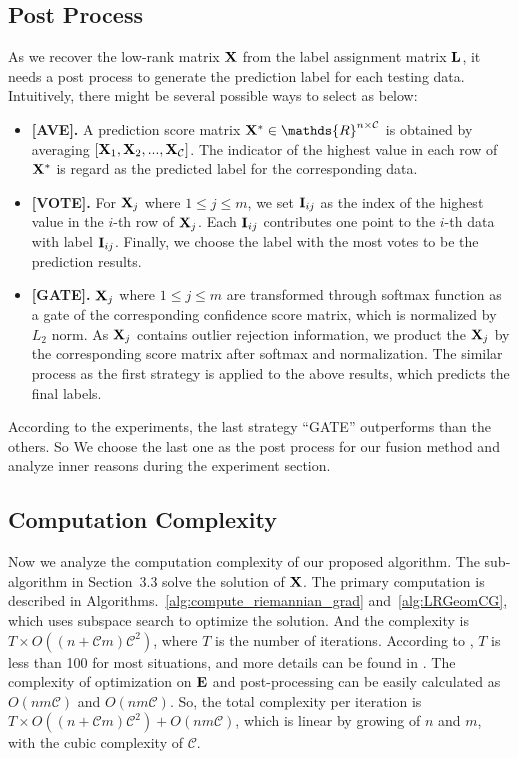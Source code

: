\documentclass[10pt,twocolumn,letterpaper]{article}
\def\bI{{\bf I}}
\def\bE{{\bf E}}
\def\calC{{\mathcal{C}}}
\def\bL{{\bf L}}
\def\dsR{\mathds{R}}
\def\bX{{\bf X}}
\def\bI{{\bf I}}
\def\bX{{\bf X}}
\begin{document}
\subsection{Post Process}
As we recover the low-rank matrix $\bX$ from the label assignment matrix $\bL$,
it needs a post process to generate the prediction label for each testing data.
Intuitively, there might be several possible ways to select as below:
\begin{itemize}
  \item \textbf{[AVE].} A prediction score matrix $\bX^{*} \in \dsR^{n \times {\calC}}$ is obtained by averaging $[ \bX_1, \bX_2, ..., \bX_{\calC}]$.
    The indicator of the highest value in each row of $\bX^{*}$ is regard as the predicted label for the corresponding data.
  \item \textbf{[VOTE].} For $\bX_j$ where $1 \leq j \leq m$, we set $\bI_{ij}$ as the index of the highest value in the $i$-th row of $\bX_j$.
      Each $\bI_{ij}$ contributes one point to the $i$-th data with label $\bI_{ij}$.
      Finally, we choose the label with the most votes to be the prediction results.
  \item \textbf{[GATE].} $\bX_j$ where $1 \leq j \leq m$ are transformed through softmax function as a gate of the corresponding confidence score matrix, which is normalized by $L_2$ norm.
      As $\bX_j$ contains outlier rejection information, we product the $\bX_j$ by the corresponding score matrix after softmax and normalization.
      The similar process as the first strategy is applied to the above results, which predicts the final labels.
\end{itemize}
According to the experiments, the last strategy ``GATE'' outperforms than the others.
So We choose the last one as the post process for our fusion method and analyze inner reasons during the experiment section.

\subsection{Computation Complexity}

Now we analyze the computation complexity of our proposed algorithm.
The sub-algorithm in Section~3.3 solve the solution of $\bX$.
The primary computation is described in Algorithms.~\ref{alg:compute_riemannian_grad} and~\ref{alg:LRGeomCG},
which uses subspace search to optimize the solution.
And the complexity is $T \times O((n+{\calC}m){\calC}^2)$, where $T$ is the number of iterations.
According to \cite{vandereycken2013lowrank}, $T$ is less than 100 for most situations,
and more details can be found in \cite{vandereycken2013lowrank}.
The complexity of optimization on $\bE$ and post-processing can be easily calculated as $O(nm{\calC})$ and $O(nm{\calC})$.
So, the total complexity per iteration is $T \times O((n+{\calC}m){\calC}^2) + O(nm{\calC})$,
which is linear by growing of $n$ and $m$, with the cubic complexity of $\calC$.
\end{document}
